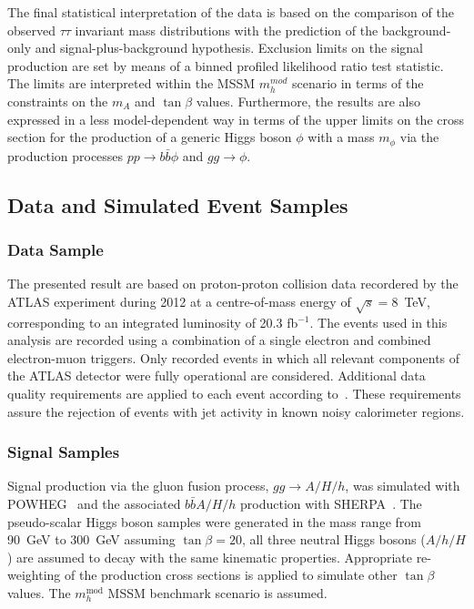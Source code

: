 The final statistical interpretation of the data is based on the 
comparison of the observed $\tau\tau$ invariant mass distributions with the prediction of the  background-only and signal-plus-background
hypothesis. Exclusion limits on the signal production are set by means of a binned profiled likelihood ratio
test statistic. The limits are interpreted  within the MSSM $m_{h}^{mod}$ scenario in terms of the constraints on the 
 $m_A$ and $\tan\beta$ values. Furthermore, the results are also expressed in a less model-dependent
way in terms of the upper limits on the cross section for the production of a generic Higgs boson $\phi$ with a  mass  $m_\phi$ 
via the production processes $pp \rightarrow b\bar{b}\phi$ and $gg \rightarrow \phi$.


 




\subsection{Data and Simulated Event Samples}
\label{sec:sample}
\subsubsection{Data Sample}

The  presented result  are based on proton-proton collision data
recordered by the ATLAS experiment during 2012 at a centre-of-mass energy of $\sqrt{s}=8$~TeV,
corresponding to an integrated luminosity of 20.3 fb$^{-1}$.
The events used in this analysis are recorded using a combination of a
single electron and combined electron-muon triggers. Only recorded events 
in which all  relevant components of the ATLAS detector were
fully operational are considered.
Additional data quality requirements are applied to each event according to~\cite{ATLASCLEANING}.
These requirements assure the rejection of  events %
with jet activity in known noisy calorimeter regions. 




\subsubsection{Signal Samples}
Signal production via the gluon fusion process, $gg\rightarrow A/H/h$,
was simulated with POWHEG~\cite{POWHEG} and the associated
$b\bar{b}A/H/h$ production with SHERPA~\cite{SHERPA}.  The
pseudo-scalar Higgs boson samples were generated in the mass range from
90~GeV to 300~GeV assuming $\tan\beta = 20$, all three  neutral Higgs bosons ($A/h/H$) are assumed to decay 
with the same kinematic properties. Appropriate re-weighting of the production cross sections is applied 
to simulate other $\tan\beta$ values. The $m_h^{\mathrm{mod}}$ MSSM benchmark scenario is assumed.


